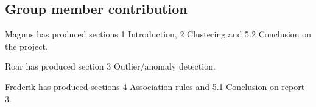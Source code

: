 \subsection{Group member contribution}
Magnus has produced sections 1 Introduction, 2 Clustering and 5.2 Conclusion on the project.

Roar has produced section 3 Outlier/anomaly detection.

Frederik has produced sections 4 Association rules and 5.1 Conclusion on report 3.